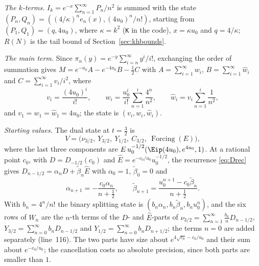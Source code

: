\emph{The $k$-terms.} $I_k = e^{-x}\sum_{n=1}^{\infty}P_n/n^2$ is summed with the state
$(P_n, Q_n) = ((4/\kappa)^ne_n(x), (4u_0)^n/n!)$, starting from $(P_1, Q_1) = (q, 4u_0)$, where $\kappa = k^2$ (\texttt{K} in the code), $x = \kappa u_0$ and
$q = 4/\kappa$; $R(N)$ is the tail bound of Section~\ref{sec:khbounds}.

\emph{The main term.} Since $\pi_n(y) = e^{-y}\sum_{i=n}^{\infty}y^i/i!$, exchanging the order of summation gives
$M = e^{-u_0}A - e^{-4u_0}B - \frac12C$ with $A = \sum_{i=1}^{\infty}w_i$, $B = \sum_{i=1}^{\infty}\hat w_i$ and
$C = \sum_{i=1}^{\infty}v_i/i^2$, where
\[
  v_i = \frac{(4u_0)^i}{i!}, \qquad w_i = \frac{u_0^i}{i!}\sum_{n=1}^{i}\frac{4^n}{n^2}, \qquad
  \hat w_i = v_i\sum_{n=1}^{i}\frac1{n^2},
\]
and $v_1 = w_1 = \hat w_1 = 4u_0$; the state is $(v_i, w_i, \hat w_i)$.

\emph{Starting values.} The dual state at $t = \frac32$ is
\[
  V = \bigl(\nu_{3/2},\ Y_{3/2},\ Y_{1/2},\ C_{3/2},\ \operatorname{Forcing}(E)\bigr),
\]
where the last three components are $E\,u_0^{-1/2}(\Eip(4u_0), e^{4u_0}, 1)$. At a rational point $c_0$, with $D = D_{-1/2}(c_0)$ and
$\hat E = e^{-c_0/u_0}u_0^{-1/2}$, the recurrence \eqref{eq:Drec} gives $D_{n-1/2} = \alpha_nD + \tilde\beta_n\hat E$
with $\alpha_0 = 1$, $\tilde\beta_0 = 0$ and
\[
  \alpha_{n+1} = -\frac{c_0\alpha_n}{n+\frac12}, \qquad \tilde\beta_{n+1} = \frac{u_0^{n+1} - c_0\tilde\beta_n}{n+\frac12}.
\]
With $b_n = 4^n/n!$ the binary splitting state is $(b_n\alpha_n, b_n\tilde\beta_n, b_nu_0^n)$, and the six rows of
$W_n$ are the $n$-th terms of the $D$- and $\hat E$-parts of $\nu_{3/2} = \sum_{n=1}^{\infty}\frac{b_n}nD_{n-1/2}$,
$Y_{3/2} = \sum_{n=0}^{\infty}b_nD_{n-1/2}$ and $Y_{1/2} = \sum_{n=0}^{\infty}b_nD_{n+1/2}$; the terms $n = 0$ are added
separately (line~116). The two parts have size about $e^{4\sqrt{c_0} - c_0/u_0}$ and their sum about $e^{-c_0/u_0}$;
the cancellation costs no absolute precision, since both parts are smaller than $1$.

